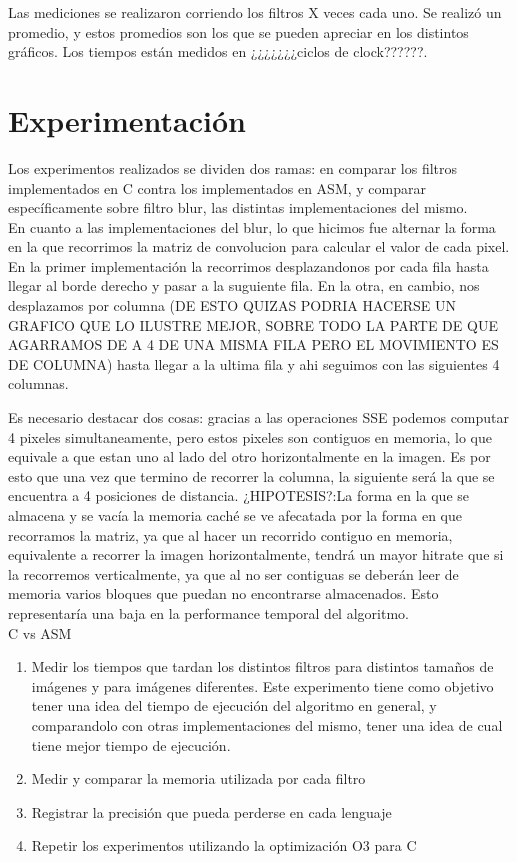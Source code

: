 \documentclass[10pt,a4paper,spanish]{article}
\begin{document}
Las mediciones se realizaron corriendo los filtros X veces cada uno. Se realizó un promedio, y estos promedios son los que se pueden apreciar en los distintos gráficos. Los tiempos están medidos en ¿¿¿¿¿¿¿ciclos de clock??????.

\section{Experimentación}

Los experimentos realizados se dividen dos ramas: en comparar los filtros implementados en C contra los implementados en ASM, y comparar específicamente sobre filtro blur, las distintas implementaciones del mismo. \\

En cuanto a las implementaciones del blur, lo que hicimos fue alternar la forma en la que recorrimos la matriz de convolucion para calcular el valor de cada pixel. En la primer implementación la recorrimos desplazandonos por cada fila hasta llegar al borde derecho y pasar a la suguiente fila. En la otra, en cambio, nos desplazamos por columna (DE ESTO QUIZAS PODRIA HACERSE UN GRAFICO QUE LO ILUSTRE MEJOR, SOBRE TODO LA PARTE DE QUE AGARRAMOS DE A 4 DE UNA MISMA FILA PERO EL MOVIMIENTO ES DE COLUMNA) hasta llegar a la ultima fila y ahi seguimos con las siguientes 4 columnas.

Es necesario destacar dos cosas: gracias a las operaciones SSE podemos computar 4 pixeles simultaneamente, pero estos pixeles son contiguos en memoria, lo que equivale a que estan uno al lado del otro horizontalmente en la imagen. Es por esto que una vez que termino de recorrer la columna, la siguiente será la que se encuentra a 4 posiciones de distancia.
¿HIPOTESIS?:La forma en la que se almacena y se vacía la memoria caché se ve afecatada por la forma en que recorramos la matriz, ya que al hacer un recorrido contiguo en memoria, equivalente a recorrer la imagen horizontalmente, tendrá un mayor hitrate que si la recorremos verticalmente, ya que al no ser contiguas se deberán leer de memoria varios bloques que puedan no encontrarse almacenados. Esto representaría una baja en la performance temporal del algoritmo. \\

C vs ASM

\begin{enumerate}
	\item Medir los tiempos que tardan los distintos filtros para distintos tamaños de imágenes y para imágenes diferentes. Este experimento tiene como objetivo tener una idea del tiempo de ejecución del algoritmo en general, y comparandolo con otras implementaciones del mismo, tener una idea de cual tiene mejor tiempo de ejecución.
	\item Medir y comparar la memoria utilizada por cada filtro
	\item Registrar la precisión que pueda perderse en cada lenguaje
	\item Repetir los experimentos utilizando la optimización O3 para C
\end{enumerate}
\end{document}
